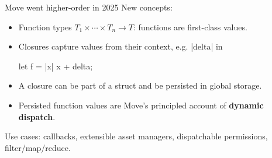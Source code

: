 \documentclass[aspectratio=169,11pt]{beamer}
\begin{document}
\begin{frame}[fragile,c]{Move went higher-order in 2025}
  New concepts:
  \begin{itemize}
    \item Function types $T_1 \times \cdots \times T_n \to T$: functions are first-class values.
    \item Closures capture values from their context, e.g. |delta| in
\begin{Move}
let f = |x| x + delta;
\end{Move}
    \item A closure can be part of a struct and be persisted in global storage.
    \item Persisted function values are Move's principled account of \textbf{dynamic dispatch}.
  \end{itemize}
  \medskip
  Use cases: callbacks, extensible asset managers, dispatchable permissions, filter/map/reduce.
\end{frame}
\end{document}

